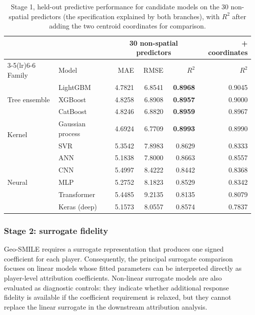\begin{table}[H]
\centering
\caption{Stage 1, held-out predictive performance for candidate models on the 30 non-spatial predictors (the specification explained by both branches), with $R^2$ after adding the two centroid coordinates for comparison.}
\label{tab:sel_pred}
\small
\begin{tabular}{llrrrr}
\toprule
& & \multicolumn{3}{c}{30 non-spatial predictors} & + coordinates \\
\cmidrule(lr){3-5}\cmidrule(lr){6-6}
Family & Model & MAE & RMSE & $R^2$ & $R^2$ \\
\midrule
\multirow{3}{*}{Tree ensemble}
 & LightGBM          & 4.7821 & 6.8541 & \textbf{0.8968} & 0.9045 \\
 & XGBoost           & 4.8258 & 6.8908 & \textbf{0.8957} & 0.9000 \\
 & CatBoost          & 4.8246 & 6.8820 & \textbf{0.8959} & 0.8967 \\
\midrule
\multirow{2}{*}{Kernel}
 & Gaussian process  & 4.6924 & 6.7709 & \textbf{0.8993} & 0.8990 \\
 & SVR               & 5.3542 & 7.8983 & 0.8629 & 0.8333 \\
\midrule
\multirow{5}{*}{Neural}
 & ANN               & 5.1838 & 7.8000 & 0.8663 & 0.8557 \\
 & CNN               & 5.4997 & 8.4222 & 0.8442 & 0.8368 \\
 & MLP               & 5.2752 & 8.1823 & 0.8529 & 0.8342 \\
 & Transformer       & 5.4485 & 9.2135 & 0.8135 & 0.8079 \\
 & Keras (deep)      & 5.1573 & 8.0557 & 0.8574 & 0.7837 \\
\bottomrule
\end{tabular}
\end{table}

\subsubsection{Stage 2: surrogate fidelity}
\label{sec}

Geo-SMILE requires a surrogate representation that produces one signed coefficient for each player. Consequently, the principal surrogate comparison focuses on linear models whose fitted parameters can be interpreted directly as player-level attribution coefficients. Non-linear surrogate models are also evaluated as diagnostic controls: they indicate whether additional response fidelity is available if the coefficient requirement is relaxed, but they cannot replace the linear surrogate in the downstream attribution analysis.


